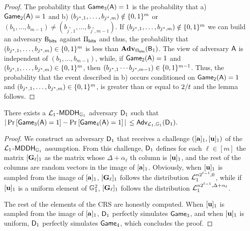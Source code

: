 \begin{proof}  The probability that
 \(\mathsf{Game}_3(\mathsf{A})=1\) is the probability that  a) \(\mathsf{Game}_2(\mathsf{A})=1\) and
b) \((b_{j^*,1},\ldots,b_{j^*,m})\notin\{0,1\}^m\) or \((b_1,\ldots, b_{m-1}) \neq (b_{j^*,1},\ldots, b_{j^*,m-1})\). If \((b_{j^*,1},\ldots,\allowbreak b_{j^*,m})\notin\{0,1\}^m\) we can build an adversary \(\mathsf{B}_{\mathsf{bits}}\) against \(\Pi_{\mathsf{bits}}\) and thus, the probability that \((b_{j^*,1},\ldots,b_{j^*,m})\in\{0,1\}^m\) is less than \(\mathbf{Adv}_{\Pi_{\mathsf{bits}}}(\mathsf{B}_1)\). The view of adversary \(\mathsf{A}\) is independent of \((b_{1},\ldots, b_{m-1})\), while, if \(\mathsf{Game_2}(\mathsf{A})=1\) and \((b_{j^*,1},\ldots,b_{j^*,m})\in\{0,1\}^{m}\), then \((b_{j^*,1}\cdots b_{j^*,m-1})\in\{0,1\}^{m-1}\). Thus, 
the probability that the event described in b) occurs conditioned on \(\mathsf{Game_2}(\mathsf{A})=1\) and \((b_{j^*,1},\ldots,b_{j^*,m})\in\{0,1\}^{m}\), is greater than or equal to \(2/t \) and the lemma follows.
\end{proof}

\begin{lemma} There exists a \(\mathcal{L}_1\)-\(\mathsf{MDDH}_{\mathbb{G}_1}\) adversary \(\mathsf{D}_1\) such that
\(|\Pr\left[\mathsf{Game}_{3}(\mathsf{A})=1\right]\allowbreak-\Pr\left[\mathsf{Game}_{4}(\mathsf{A})=1\right]|\) $\leq
    \mathsf{Adv}_{\mathcal{L}_1,\mathbb{G}_1}(\mathsf{D}_1).$
\label{lemma:bits2}
\end{lemma}

\begin{proof}
We construct an adversary \(\mathsf{D}_1\) that receives 
a challenge \(([\mathbf{a}]_1,[\mathbf{u}]_1)\) of the 
\(\mathcal{L}_1\)-\(\mathsf{MDDH}_{\mathbb{G}_1}\) assumption. From this challenge, \(\mathsf{D}_1\) defines for each \(\ell\in [m]\) the matrix  \([\mathbf{{G}}_\ell]_1\) as the matrix whose  \(\Delta+\alpha_\ell\) th column is \([\mathbf{u}]_1\), and the rest of the columns are random vectors in the image of \([\mathbf{a}]_1\). 
Obviously, when \([\mathbf{u}]_1\) is sampled from 
the image of \([\mathbf{a}]_1\), \([\mathbf{{G}}_\ell]_1\) follows the distribution \(\mathcal{L}_1^{n2^{\ell-1},0}\), while if \([\mathbf{u}]_1\) is a uniform element of \(\mathbb{G}^2_1\), \([\mathbf{{G}}_\ell]_1\) follows the distribution \(\mathcal{L}_1^{n2^{\ell-1},\Delta+\alpha_\ell}\). 
 
The rest of the elements of the CRS are honestly computed. When \([\mathbf{u}]_1\) is sampled from the image of \([\mathbf{{a}}]_1\), \(\mathsf{D}_1\) perfectly simulates \(\mathsf{Game}_3\), and when \([\mathbf{u}]_1\) is uniform, \(\mathsf{D}_1\) perfectly simulates \(\mathsf{Game}_4\), which concludes the proof. 
\end{proof}


